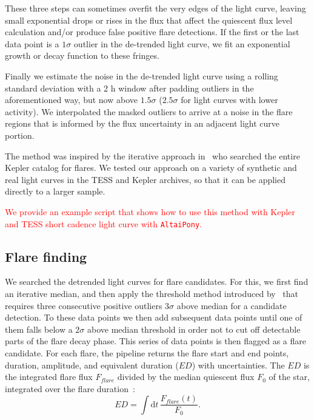 \documentclass[fleqn,usenatbib,letters]{mnras}%
\begin{document}
These three steps can sometimes overfit the very edges of the light curve, leaving small exponential drops or rises in the flux that affect the quiescent flux level calculation and/or produce false positive flare detections. If the first or the last data point is a $1\sigma$ outlier in the de-trended light curve, we fit an exponential growth or decay function to these fringes.

Finally we estimate the noise in the de-trended light curve using a rolling standard deviation with a 2 h window after padding outliers in the aforementioned way, but now above $1.5 \sigma$ ($2.5 \sigma$ for light curves with lower activity). We interpolated the masked outliers to arrive at a noise in the flare regions that is informed by the flux uncertainty in an adjacent light curve portion.

The method was inspired by the iterative approach in~\citet{davenport2016} who searched the entire Kepler catalog for flares. We tested our approach on a variety of synthetic and real light curves in the TESS and Kepler archives, so that it can be applied directly to a larger sample.

\textcolor{red}{We provide an example script that shows how to use this method with Kepler and TESS short cadence light curve with \texttt{AltaiPony}.}

\subsection{Flare finding}
\label{sec:flarefind}
We searched the detrended light curves for flare candidates. For this, we first find an iterative median, and then apply the threshold method introduced by~\citep{chang2015} that requires three consecutive positive outliers $3 \sigma$ above median for a candidate detection. To these data points we then add subsequent data points until one of them falls below a $2 \sigma$ above median threshold in order not to cut off detectable parts of the flare decay phase. This series of data points is then flagged as a flare candidate. For each flare, the pipeline returns the flare start and end points, duration, amplitude, and equivalent duration ($ED$) with uncertainties. The $ED$ is the integrated flare flux $F_{flare}$ divided by the median quiescent flux $F_0$ of the star, integrated over the flare duration~\citep{gershberg1972}:
\begin{equation}
\label{eq:ED}
ED=\displaystyle \int \mathrm dt\, \frac{F_{flare}(t)}{F_0}.
\end{equation}
\end{document}
